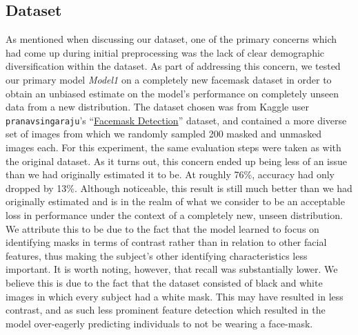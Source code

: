 \documentclass{article}
\begin{document}
\begin{figure}[h!]
  \begin{floatrow}
  \end{floatrow}
\end{figure}



\subsection{Dataset}

As mentioned when discussing our dataset, one of the primary concerns which had come up during initial preprocessing was the lack of clear demographic diversification within the dataset. As part of addressing this concern, we tested our primary model \textit{Model1} on a completely new facemask dataset in order to obtain an unbiased estimate on the model's performance on completely unseen data from a new distribution. The dataset chosen was from Kaggle user \texttt{pranavsingaraju}'s \enquote{\href{https://github.com/X-zhangyang/Real-World-Masked-Face-Dataset}{Facemask Detection}} dataset, and contained a more diverse set of images from which we randomly sampled 200 masked and unmasked images each. For this experiment, the same evaluation steps were taken as with the original dataset. As it turns out, this concern ended up being less of an issue than we had originally estimated it to be. At roughly 76\%, accuracy had only dropped by 13\%. Although noticeable, this result is still much better than we had originally estimated and is in the realm of what we consider to be an acceptable loss in performance under the context of a completely new, unseen distribution. We attribute this to be due to the fact that the model learned to focus on identifying masks in terms of contrast rather than in relation to other facial features, thus making the subject's other identifying characteristics less important. It is worth noting, however, that recall was substantially lower. We believe this is due to the fact that the dataset consisted of black and white images in which every subject had a white mask. This may have resulted in less contrast, and as such less prominent feature detection which resulted in the model over-eagerly predicting individuals to not be wearing a face-mask.
\end{document}
